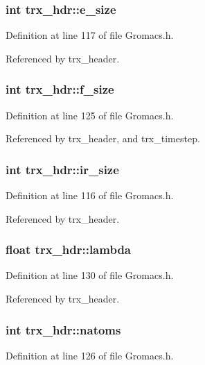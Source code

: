 \subsubsection{\setlength{\rightskip}{0pt plus 5cm}int trx\_\-hdr::e\_\-size}\label{structtrx__hdr_m3}




Definition at line 117 of file Gromacs.h.

Referenced by trx\_\-header.
\subsubsection{\setlength{\rightskip}{0pt plus 5cm}int trx\_\-hdr::f\_\-size}\label{structtrx__hdr_m11}




Definition at line 125 of file Gromacs.h.

Referenced by trx\_\-header, and trx\_\-timestep.
\subsubsection{\setlength{\rightskip}{0pt plus 5cm}int trx\_\-hdr::ir\_\-size}\label{structtrx__hdr_m2}




Definition at line 116 of file Gromacs.h.

Referenced by trx\_\-header.
\subsubsection{\setlength{\rightskip}{0pt plus 5cm}float trx\_\-hdr::lambda}\label{structtrx__hdr_m16}




Definition at line 130 of file Gromacs.h.

Referenced by trx\_\-header.
\subsubsection{\setlength{\rightskip}{0pt plus 5cm}int trx\_\-hdr::natoms}\label{structtrx__hdr_m12}




Definition at line 126 of file Gromacs.h.

